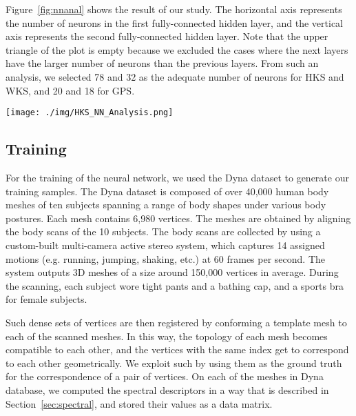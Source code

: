 \documentclass[5p,twocolumn,10pt,times]{elsarticle}
\begin{document}
Figure~\ref{fig:nnanal} shows the result of our study. The horizontal axis represents the number of neurons in the first fully-connected hidden layer, and the vertical axis represents the second fully-connected hidden layer. Note that the upper triangle of the plot is empty because we excluded the cases where the next layers have the larger number of neurons than the previous layers. From such an analysis, we selected 78 and 32 as the adequate number of neurons for HKS and WKS, and 20 and 18 for GPS.


\begin{figure*}
	\begin{center}
			\texttt{[image: ./img/HKS\_NN\_Analysis.png]}
	\end{center}
	\caption{Visualization of grid analysis for selecting an adequate number of neurons. Samples were collected every 2 units in each direction, and the values were interpolated for the visualization of the contour diagrams. From this, we choose 78 and 32 as the number of neurons for HKS and GPS, and 20 and 18 for GPS.}
	\label{fig:nnanal}
\end{figure*}



\subsection{Training}
\label{sec:training}

For the training of the neural network, we used the Dyna dataset \cite{Dyna} to generate our training samples. The Dyna dataset is composed of over 40,000 human body meshes of ten subjects spanning a range of body shapes under various body postures. Each mesh contains 6,980 vertices. The meshes are obtained by aligning the body scans of the 10 subjects. The body scans are collected by using a custom-built multi-camera active stereo system, which captures 14 assigned motions (e.g. running, jumping, shaking, etc.) at 60 frames per second. The system outputs 3D meshes of a size around 150,000 vertices in average. During the scanning, each subject wore tight pants and a bathing cap, and a sports bra for female subjects.

Such dense sets of vertices are then registered by conforming a template mesh to each of the scanned meshes. In this way, the topology of each mesh becomes compatible to each other, and the vertices with the same index get to correspond to each other geometrically. We exploit such by using them as the ground truth for the correspondence of a pair of vertices. On each of the meshes in Dyna database, we computed the spectral descriptors in a way that is described in Section~\ref{sec:spectral}, and stored their values as a data matrix.
\end{document}

